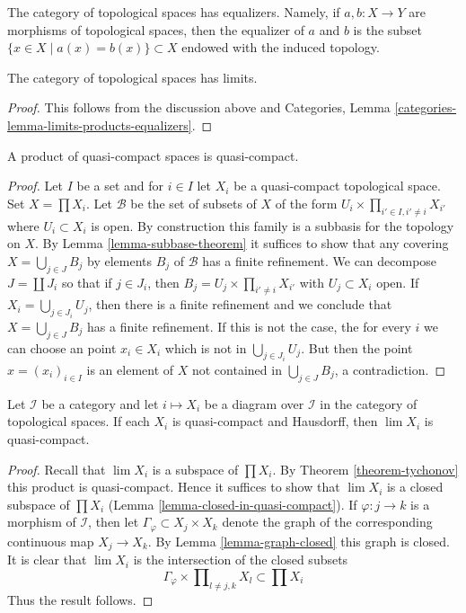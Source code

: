 \medskip\noindent
The category of topological spaces has equalizers. Namely, if
$a, b : X \to Y$ are morphisms of topological spaces, then the
equalizer of $a$ and $b$ is the subset $\{x \in X \mid a(x) = b(x)\} \subset X$
endowed with the induced topology.

\begin{lemma}
\label{lemma-limits}
The category of topological spaces has limits.
\end{lemma}

\begin{proof}
This follows from the discussion above and
Categories, Lemma \ref{categories-lemma-limits-products-equalizers}.
\end{proof}

\begin{theorem}[Tychonov]
\label{theorem-tychonov}
A product of quasi-compact spaces is quasi-compact.
\end{theorem}

\begin{proof}
Let $I$ be a set and for $i \in I$ let $X_i$ be a quasi-compact topological
space. Set $X = \prod X_i$. Let $\mathcal{B}$ be the set of subsets of $X$
of the form $U_i \times \prod_{i' \in I, i' \not = i} X_{i'}$ where
$U_i \subset X_i$ is open. By construction this family is a subbasis
for the topology on $X$. By Lemma \ref{lemma-subbase-theorem} it
suffices to show that any covering $X = \bigcup_{j \in J} B_j$
by elements $B_j$ of $\mathcal{B}$ has a finite refinement.
We can decompose $J = \coprod J_i$ so that if $j \in J_i$, then
$B_j = U_j \times \prod_{i' \not = i} X_{i'}$ with $U_j \subset X_i$
open. If $X_i = \bigcup_{j \in J_i} U_j$, then there is a finite
refinement and we conclude that $X = \bigcup_{j \in J} B_j$
has a finite refinement. If this is not the case, the for every $i$
we can choose an point $x_i \in X_i$ which is not in
$\bigcup_{j \in J_i} U_j$. But then the point $x = (x_i)_{i \in I}$
is an element of $X$ not contained in $\bigcup_{j \in J} B_j$, a
contradiction.
\end{proof}

\begin{lemma}
\label{lemma-inverse-limit-quasi-compact}
Let $\mathcal{I}$ be a category and let $i \mapsto X_i$
be a diagram over $\mathcal{I}$ in the category of topological
spaces. If each $X_i$ is quasi-compact and Hausdorff, then
$\lim X_i$ is quasi-compact.
\end{lemma}

\begin{proof}
Recall that $\lim X_i$ is a subspace of $\prod X_i$. By
Theorem \ref{theorem-tychonov} this product is quasi-compact. Hence it
suffices to show that $\lim X_i$ is a closed subspace of $\prod X_i$
(Lemma \ref{lemma-closed-in-quasi-compact}).
If $\varphi : j \to k$ is a morphism of $\mathcal{I}$, then
let $\Gamma_\varphi \subset X_j \times X_k$ denote the graph
of the corresponding continuous map $X_j \to X_k$. By
Lemma \ref{lemma-graph-closed} this graph is closed.
It is clear that $\lim X_i$ is the intersection of the
closed subsets
$$
\Gamma_\varphi \times \prod\nolimits_{l \not = j, k} X_l
\subset \prod X_i
$$
Thus the result follows.
\end{proof}




